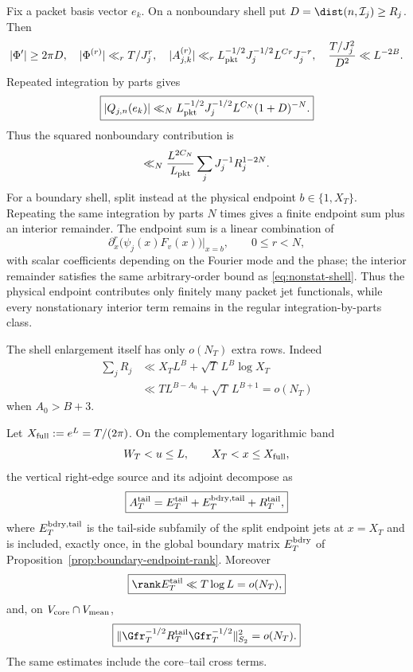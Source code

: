 Fix a packet basis vector $e_k$. On a nonboundary shell put
$D=\dist(n,\mathcal I_j)\ge R_j$. Then
\[
|\Phi'|\ge2\pi D,
\quad |\Phi^{(r)}|\ll_rT/J_j^r,
\quad |A_{j,k}^{(r)}|\ll_rL_{\rm pkt}^{-1/2}J_j^{-1/2}L^{Cr}J_j^{-r},
\quad \frac{T/J_j^2}{D^2}\ll L^{-2B}.
\]
Repeated integration by parts gives
\begin{equation}
\boxed{|Q_{j,n}(e_k)|
\ll_NL_{\rm pkt}^{-1/2}J_j^{-1/2}L^{C_N}(1+D)^{-N}.}
\label{eq:nonstat-shell}
\end{equation}
Thus the squared nonboundary contribution is
\[
\ll_N\frac{L^{2C_N}}{L_{\rm pkt}}
\sum_jJ_j^{-1}R_j^{1-2N}.
\]
For a boundary shell, split instead at the physical endpoint
$b\in\{1,X_T\}$. Repeating the same integration by parts $N$ times gives a
finite endpoint sum plus an interior remainder. The endpoint sum is a linear
combination of
\begin{equation}
\boxed{
\partial_x^r\!\bigl(\psi_j(x)F_v(x)\bigr)\big|_{x=b},
\qquad 0\le r<N,
}
\label{eq:boundary-shell-jets}
\end{equation}
with scalar coefficients depending on the Fourier mode and the phase; the
interior remainder satisfies the same arbitrary-order bound as
\eqref{eq:nonstat-shell}. Thus the physical endpoint contributes only finitely
many packet jet functionals, while every nonstationary interior term remains in
the regular integration-by-parts class.

The shell enlargement itself has only $o(N_T)$ extra rows. Indeed
\begin{align*}
\sum_jR_j
&\ll X_TL^B+\sqrt T\,L^B\log X_T\\
&\ll TL^{B-A_0}+\sqrt T\,L^{B+1}=o(N_T)
\end{align*}
when $A_0>B+3$.

\begin{proposition}
\label{prop:terminal-log-tail}
Let $X_{\rm full}:=e^L=T/(2\pi)$. On the complementary logarithmic band
\[
W_T<u\le L,
\qquad
X_T<x\le X_{\rm full},
\]
the vertical right-edge source and its adjoint decompose as
\begin{equation}
\boxed{
A_T^{\rm tail}
=E_T^{\rm tail}+E_T^{\rm bdry,tail}+R_T^{\rm tail},
}
\label{eq:terminal-log-tail}
\end{equation}
where $E_T^{\rm bdry,tail}$ is the tail-side subfamily of the split endpoint
jets at $x=X_T$ and is included, exactly once, in the global boundary matrix
$E_T^{\rm bdry}$ of Proposition~\ref{prop:boundary-endpoint-rank}. Moreover
\begin{equation}
\boxed{
\rank E_T^{\rm tail}
\ll T\log L=o(N_T),
}
\label{eq:terminal-log-tail-rank}
\end{equation}
and, on $V_{\rm core}\cap V_{\rm mean}$,
\begin{equation}
\boxed{
\|\Gfr_T^{-1/2}R_T^{\rm tail}\Gfr_T^{-1/2}\|_{S_2}^2=o(N_T).
}
\label{eq:terminal-log-tail-bounds}
\end{equation}
The same estimates include the core--tail cross terms.
\end{proposition}

